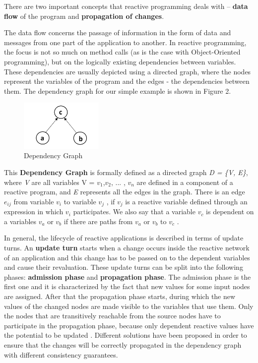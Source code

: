 \documentclass{sigplanconf}
\begin{document}
There are two important concepts that reactive programming deals with -- \textbf{data flow} of the program and \textbf{propagation of changes}.

The data flow concerns the passage of information in the form of data and messages from one part of the application to another. In reactive programming, the focus is not so much on method calls (as is the case with Object-Oriented programming), but on the logically existing dependencies between variables. These dependencies are usually depicted using a directed graph, where the nodes represent the variables of the program and the edges - the dependencies between them. The dependency graph for our simple example is shown in Figure 2.

\begin{figure}
\centering
\includegraphics[width=4cm]{dependencyGraph}
\caption{Dependency Graph}
\end{figure}

This \textbf{Dependency Graph} is formally defined as a directed graph \textit{D = \{V, E\}}, where \textit{V} are all variables V = $v_{1}$,$ v_{2}$, ... , $v_{n}$  are  defined in a component of a reactive program, and \textit{E} represents all the edges in the graph. There is an edge $e_{ij}$ from variable $v_{ i}$ to variable $v_{j}$ , if  $v_{j}$ is a reactive variable defined through an expression in which $v_{i}$ participates.  We also say that a variable $v_{c}$ is dependent on a variables $v_{a}$ or $v_{b}$ if there are paths from $v_{a}$ or $v_{b}$ to $v_{c}$ \cite{dream}.

In general, the lifecycle of reactive applications is described in terms of update turns.  An \textbf{update turn} starts when a change occurs inside the reactive network of an application and this change has to be passed on to the dependent variables and cause their revaluation. These update turns can be split into the following phases: \textbf{admission phase} and \textbf{propagation phase}. The admission phase is the first one and it is characterized by the fact that new values for some input nodes are assigned. After that the propagation phase starts, during which the new values of the changed nodes are made visible to the variables that use them. Only the nodes that are transitively reachable from the source nodes have to participate in the propagation phase, because only dependent reactive values have the potential to be updated \cite{sidup}. Different solutions have been proposed in order to ensure that the changes will be correctly propagated in the dependency graph with different consistency guarantees.
\end{document}
